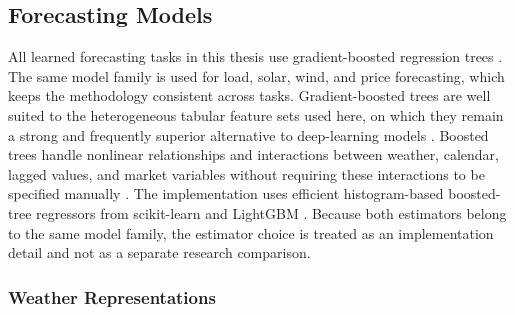 

\subsection{Forecasting Models}
\label{sec:component_forecast_models}

All learned forecasting tasks in this thesis use gradient-boosted regression
trees \cite{friedman2001gbm}. The same model family is used for load, solar,
wind, and price forecasting, which keeps the methodology consistent across
tasks. Gradient-boosted trees are well suited to the heterogeneous tabular
feature sets used here, on which they remain a strong and frequently superior
alternative to deep-learning models
\cite{grinsztajn2022tree,shwartzziv2022tabular}.
Boosted trees handle nonlinear relationships and interactions between
weather, calendar, lagged values, and market variables without requiring these
interactions to be specified manually
\cite{hastie2009elements,friedman2001gbm}. The implementation uses
efficient histogram-based boosted-tree regressors from scikit-learn and
LightGBM \cite{pedregosa2011sklearn,ke2017lightgbm}. Because both estimators
belong to the same model family, the estimator choice is treated as an
implementation detail and not as a separate research comparison.

\subsubsection{Weather Representations}
\label{sec:weather_representations}

